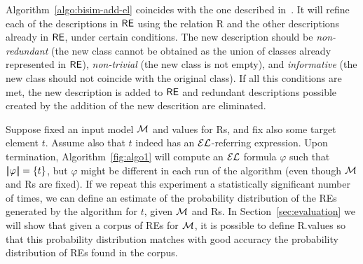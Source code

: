 Algorithm~\ref{algo:bisim-add-el} coincides with the one described in~\cite{arec2:2008:Areces}.  It will refine each of the descriptions in $\textsf{RE}$ using the relation R and the other descriptions already in $\textsf{RE}$, under certain conditions. The new description should be \emph{non-redundant} (the new  class cannot be obtained as the union of classes already represented in $\textsf{RE}$), \emph{non-trivial} (the new class is not empty), and 
\emph{informative} (the new class should not coincide with the original class).  If all this conditions are met, the new description is added to $\textsf{RE}$ and redundant descriptions possible created by the addition of the new descrition are eliminated.   

Suppose fixed an input model $\mathcal{M}$ and values for Rs, and fix also some target element $t$.  Assume also that $t$ indeed has an $\mathcal{EL}$-referring expression.  Upon termination, Algorithm~\ref{fig:algo1} will compute an $\mathcal{EL}$ formula $\varphi$ such that $|\!|\varphi|\!| = \{t\}$, but $\varphi$ might be different in each run of the algorithm (even though $\mathcal{M}$ and Rs are fixed).  If we repeat this experiment a statistically significant number of times, we can define an estimate of the probability distribution of the REs generated by the algorithm for $t$, given $\mathcal{M}$ and Rs. In Section~\ref{sec:evaluation} we will show that given a corpus of REs for $\mathcal{M}$, it is possible to define R.\puse values so that this probability distribution matches with good accuracy the probability distribution of REs found in the corpus.  

